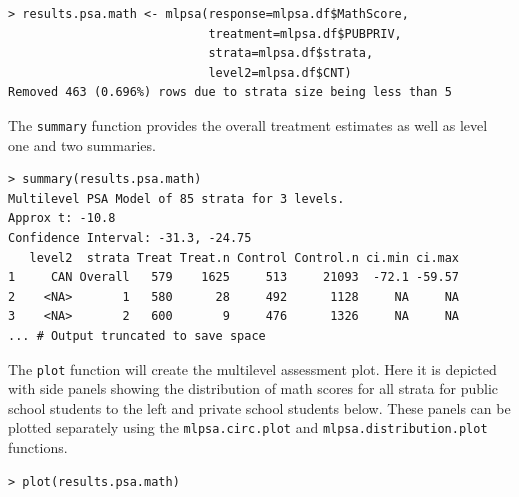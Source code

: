 \documentclass[letterpaper,12p,twoside]{article} %
\begin{document}
\begin{verbatim}
> results.psa.math <- mlpsa(response=mlpsa.df$MathScore, 
                            treatment=mlpsa.df$PUBPRIV, 
                            strata=mlpsa.df$strata, 
                            level2=mlpsa.df$CNT)
Removed 463 (0.696%) rows due to strata size being less than 5
\end{verbatim}

\noindent The \texttt{summary} function provides the overall treatment estimates as well as level one and two summaries.

\begin{verbatim}
> summary(results.psa.math)
Multilevel PSA Model of 85 strata for 3 levels.
Approx t: -10.8
Confidence Interval: -31.3, -24.75
   level2  strata Treat Treat.n Control Control.n ci.min ci.max
1     CAN Overall   579    1625     513     21093  -72.1 -59.57
2    <NA>       1   580      28     492      1128     NA     NA
3    <NA>       2   600       9     476      1326     NA     NA
... # Output truncated to save space
\end{verbatim}

\noindent The \texttt{plot} function will create the multilevel assessment plot. Here it is depicted with side panels showing the distribution of math scores for all strata for public school students to the left and private school students below. These panels can be plotted separately using the \texttt{mlpsa.circ.plot} and \texttt{mlpsa.distribution.plot} functions.

\begin{verbatim}
> plot(results.psa.math)
\end{verbatim}
\end{document}
